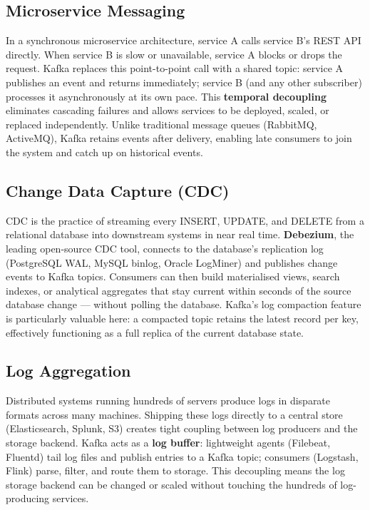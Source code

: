 \subsection{Microservice Messaging}

In a synchronous microservice architecture, service A calls service B's REST API directly.
When service B is slow or unavailable, service A blocks or drops the request.
Kafka replaces this point-to-point call with a shared topic: service A publishes an event and
returns immediately; service B (and any other subscriber) processes it asynchronously at its own pace.
This \textbf{temporal decoupling} eliminates cascading failures and allows services to be deployed,
scaled, or replaced independently.
Unlike traditional message queues (RabbitMQ, ActiveMQ), Kafka retains events after delivery,
enabling late consumers to join the system and catch up on historical events.

\subsection{Change Data Capture (CDC)}

CDC is the practice of streaming every INSERT, UPDATE, and DELETE from a relational database
into downstream systems in near real time.
\textbf{Debezium}, the leading open-source CDC tool, connects to the database's replication log
(PostgreSQL WAL, MySQL binlog, Oracle LogMiner) and publishes change events to Kafka topics.
Consumers can then build materialised views, search indexes, or analytical aggregates that
stay current within seconds of the source database change — without polling the database.
Kafka's log compaction feature is particularly valuable here: a compacted topic retains the
latest record per key, effectively functioning as a full replica of the current database state.

\subsection{Log Aggregation}

Distributed systems running hundreds of servers produce logs in disparate formats across many
machines.
Shipping these logs directly to a central store (Elasticsearch, Splunk, S3) creates tight
coupling between log producers and the storage backend.
Kafka acts as a \textbf{log buffer}: lightweight agents (Filebeat, Fluentd) tail log files and
publish entries to a Kafka topic; consumers (Logstash, Flink) parse, filter, and route them to
storage.
This decoupling means the log storage backend can be changed or scaled without touching the
hundreds of log-producing services.

